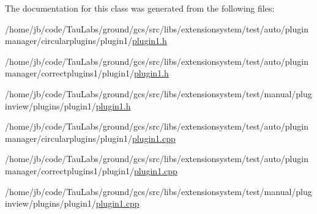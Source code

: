 \-The documentation for this class was generated from the following files\-:\begin{DoxyCompactItemize}
\item 
/home/jb/code/\-Tau\-Labs/ground/gcs/src/libs/extensionsystem/test/auto/pluginmanager/circularplugins/plugin1/\hyperlink{auto_2pluginmanager_2circularplugins_2plugin1_2plugin1_8h}{plugin1.\-h}\item 
/home/jb/code/\-Tau\-Labs/ground/gcs/src/libs/extensionsystem/test/auto/pluginmanager/correctplugins1/plugin1/\hyperlink{auto_2pluginmanager_2correctplugins1_2plugin1_2plugin1_8h}{plugin1.\-h}\item 
/home/jb/code/\-Tau\-Labs/ground/gcs/src/libs/extensionsystem/test/manual/pluginview/plugins/plugin1/\hyperlink{manual_2pluginview_2plugins_2plugin1_2plugin1_8h}{plugin1.\-h}\item 
/home/jb/code/\-Tau\-Labs/ground/gcs/src/libs/extensionsystem/test/auto/pluginmanager/circularplugins/plugin1/\hyperlink{auto_2pluginmanager_2circularplugins_2plugin1_2plugin1_8cpp}{plugin1.\-cpp}\item 
/home/jb/code/\-Tau\-Labs/ground/gcs/src/libs/extensionsystem/test/auto/pluginmanager/correctplugins1/plugin1/\hyperlink{auto_2pluginmanager_2correctplugins1_2plugin1_2plugin1_8cpp}{plugin1.\-cpp}\item 
/home/jb/code/\-Tau\-Labs/ground/gcs/src/libs/extensionsystem/test/manual/pluginview/plugins/plugin1/\hyperlink{manual_2pluginview_2plugins_2plugin1_2plugin1_8cpp}{plugin1.\-cpp}\end{DoxyCompactItemize}
